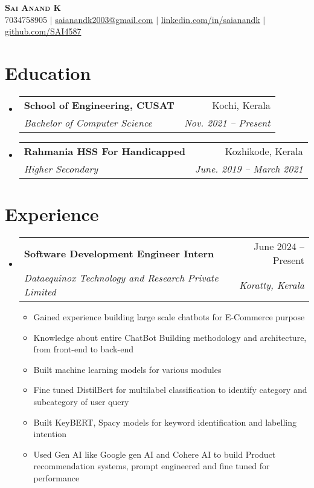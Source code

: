 \documentclass[letterpaper,11pt]{article}
\makeatletter
\newcommand{\resumeItem}[1]{
  \item\small{
    {#1 \vspace{-2pt}}
  }
}
\newcommand{\resumeSubheading}[4]{
  \vspace{-2pt}\item
    \begin{tabular*}{0.97\textwidth}[t]{l@{\extracolsep{\fill}}r}
      \textbf{#1} & #2 \\
      \textit{\small#3} & \textit{\small #4} \\
    \end{tabular*}\vspace{-7pt}
}
\newcommand{\resumeSubHeadingListStart}{\begin{itemize}[leftmargin=0.15in, label={}]}
\newcommand{\resumeSubHeadingListEnd}{\end{itemize}}
\newcommand{\resumeItemListStart}{\begin{itemize}}
\newcommand{\resumeItemListEnd}{\end{itemize}\vspace{-5pt}}
\makeatother
\begin{document}
\begin{center}
    \textbf{\Huge \scshape Sai Anand K} \\ \vspace{1pt}
    \small 7034758905 $|$ \href{mailto:saianandk2003@gmail.com}{{saianandk2003@gmail.com}} $|$ 
    \href{https://linkedin.com/in/saianandk}{{linkedin.com/in/saianandk}} $|$
    \href{https://github.com/SAI4587}{{github.com/SAI4587}}
\end{center}


\section{Education}
  \resumeSubHeadingListStart
    \resumeSubheading
      {School of Engineering, CUSAT}{Kochi, Kerala}
      {Bachelor of Computer Science}{Nov. 2021 -- Present}
    \resumeSubheading
      {Rahmania HSS For Handicapped}{Kozhikode, Kerala}
      {Higher Secondary}{June. 2019 -- March 2021}
  \resumeSubHeadingListEnd


\section{Experience}
  \resumeSubHeadingListStart

    \resumeSubheading
      {Software Development Engineer Intern}{June 2024 -- Present}
      {Dataequinox Technology and Research Private Limited}{Koratty, Kerala}
      \resumeItemListStart
        \resumeItem{Gained experience building large scale chatbots for E-Commerce purpose}
        \resumeItem{Knowledge about entire ChatBot Building methodology and architecture, from front-end to back-end}
        \resumeItem{Built machine learning models for various modules}
        \resumeItem{Fine tuned DistilBert for multilabel classification to identify category and subcategory of user query}
        \resumeItem{Built KeyBERT, Spacy models for keyword identification and labelling intention}
        \resumeItem{Used Gen AI like Google gen AI and Cohere AI to build Product recommendation systems, prompt engineered and fine tuned for performance}
      \resumeItemListEnd

  \resumeSubHeadingListEnd


\end{document}
